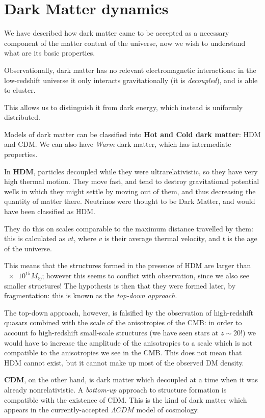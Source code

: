 \documentclass[main.tex]{subfiles}
\begin{document}
\section{Dark Matter dynamics}

We have described how dark matter came to be accepted as a necessary component of the matter content of the universe, now we wish to understand what are its basic properties. 

Observationally, dark matter has no relevant electromagnetic interactions: in the low-redshift universe it only interacts gravitationally (it is \emph{decoupled}), and is able to cluster.

This allows us to distinguish it from dark energy, which instead is uniformly distributed. 

Models of dark matter can be classified into \textbf{Hot and Cold dark matter}: HDM and CDM. 
We can also have \emph{Warm} dark matter, which has intermediate properties.

In \textbf{HDM}, particles decoupled while they were ultrarelativistic, so they have very high thermal motion.
They move fast, and tend to destroy gravitational potential wells in which they might settle by moving out of them, and thus decreasing the quantity of matter there. 
Neutrinos were thought to be Dark Matter, and would have been classified as HDM. 

They do this on scales comparable to the maximum distance travelled by them: this is calculated as \(vt\), where \(v\) is their average thermal velocity, and \(t\) is the age of the universe. 

This means that the structures formed in the presence of HDM are larger than \(\num{e15} M_{\odot}\); however this seems to conflict with observation, since we also see smaller structures!
The hypothesis is then that they were formed later, by fragmentation: this is known as the \emph{top-down approach}. 

The top-down approach, however, is falsified by the observation of high-redshift quasars combined with the scale of the anisotropies of the CMB: in order to account fo high-redshift small-scale structures (we have seen stars at \(z \sim 20\)!) we would have to increase the amplitude of the anisotropies to a scale which is not compatible to the anisotropies we see in the CMB. 
This does not mean that HDM cannot exist, but it cannot make up most of the observed DM density. 

\textbf{CDM}, on the other hand, is dark matter which decoupled at a time when it was already nonrelativistic. 
A \emph{bottom-up} approach to structure formation is compatible with the existence of CDM.
This is the kind of dark matter which appears in the currently-accepted \(\Lambda CDM\) model of cosmology.
\end{document}
